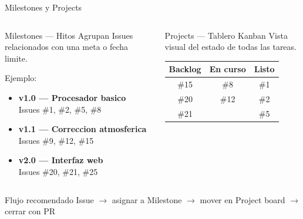 \documentclass[aspectratio=169]{beamer}
\begin{document}
\begin{frame}{Milestones y Projects}
  \begin{columns}
    \begin{block}{Milestones --- Hitos}
      Agrupan Issues relacionados con una meta o fecha limite.

      \vspace{0.2cm}
      Ejemplo:
      \begin{itemize}
        \item \textbf{v1.0 --- Procesador basico}\\{\small Issues \#1, \#2, \#5, \#8}
        \item \textbf{v1.1 --- Correccion atmosferica}\\{\small Issues \#9, \#12, \#15}
        \item \textbf{v2.0 --- Interfaz web}\\{\small Issues \#20, \#21, \#25}
      \end{itemize}
    \end{block}

    \begin{block}{Projects --- Tablero Kanban}
      Vista visual del estado de todas las tareas.

      \vspace{0.2cm}
      \begin{tabular}{|c|c|c|}
        \hline
        \textbf{Backlog} & \textbf{En curso} & \textbf{Listo} \\
        \hline
        \#15 & \#8  & \#1 \\
        \#20 & \#12 & \#2 \\
        \#21 &      & \#5 \\
        \hline
      \end{tabular}
    \end{block}
  \end{columns}

  \vspace{0.3cm}
  \begin{alertblock}{Flujo recomendado}
    Issue $\rightarrow$ asignar a Milestone $\rightarrow$ mover en Project board $\rightarrow$ cerrar con PR
  \end{alertblock}
\end{frame}
\end{document}
